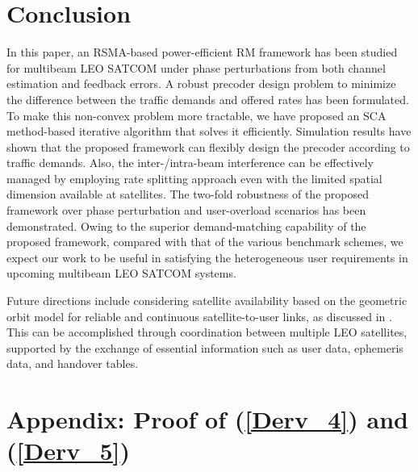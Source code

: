 \documentclass[draftclsnofoot, onecolumn, comsoc, 12pt]{IEEEtran}
\begin{document}
\section{Conclusion}
{In this paper, an RSMA-based power-efficient RM framework has been studied for multibeam LEO SATCOM under phase perturbations from both channel estimation and feedback errors.} 
A robust precoder design problem to minimize the difference between the traffic demands and offered rates has been formulated. 
To make this non-convex problem more tractable, we have proposed an SCA method-based iterative algorithm that solves it efficiently. 
 Simulation results have shown that the proposed framework can flexibly design the precoder according to traffic demands. 
Also, the inter-/intra-beam interference can be effectively managed by employing rate splitting approach even with the limited spatial dimension available at satellites. 
The two-fold robustness of the proposed framework over phase perturbation and user-overload scenarios has been demonstrated. 
{Owing to the superior demand-matching capability of the proposed framework, compared with that of the various benchmark schemes, we expect our work to be useful in satisfying the heterogeneous user requirements in upcoming multibeam LEO SATCOM systems.} 

{ Future directions include considering satellite availability based on the geometric orbit model for reliable and continuous satellite-to-user links, as discussed in \cite{tang2021computation, yoo2024cache}. This can be accomplished through coordination between multiple LEO satellites, supported by the exchange of essential information such as user data, ephemeris data, and handover tables.}


\section{Appendix: Proof of (\ref{Derv_4}) and (\ref{Derv_5})}
\end{document}
